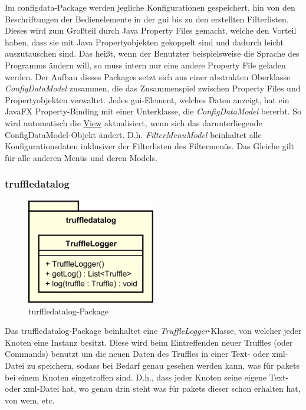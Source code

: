    \medskip
    Im configdata-Package werden jegliche Konfigurationen gespeichert, hin von den
    Beschriftungen der Bedienelemente in der \gls{gui} bis zu den erstellten Filterlisten. Dieses
    wird zum Großteil durch Java Property Files gemacht, welche den Vorteil haben, dass
    sie mit Java Propertyobjekten gekoppelt sind und dadurch leicht auszutauschen sind.
    Das heißt, wenn der Benutzter beispielsweise die Sprache des Programms ändern
    will, so muss intern nur eine andere Property File geladen werden.
    \newline
    \newline
    Der Aufbau dieses Packages setzt sich aus einer abstrakten Oberklasse
    \textit{ConfigDataModel} zusammen, die das Zusammenspiel zwischen Property Files
    und Propertyobjekten verwaltet. Jedes \gls{gui}-Element, welches Daten anzeigt, hat
    ein JavaFX Property-Binding mit einer Unterklasse, die \textit{ConfigDataModel}
    bererbt. So wird automatisch die \hyperref[subsec:view]{View} aktualisiert,
    wenn sich das darunterliegende ConfigDataModel-Objekt ändert. D.h.
    \textit{FilterMenuModel} beinhaltet alle Konfigurationsdaten inklusiver der
    Filterlisten des Filtermenüs. Das Gleiche gilt für alle anderen Menüs und
    deren Models.


    \subsubsection{truffledatalog}
    \label{subsubsec:graphlog}

    \begin{figure}[H]
      \centering
      \includegraphics[width=0.5\textwidth]{../diagramimages/truffledatalog.png}
      \caption{turffledatalog-Package}
    \end{figure}

    \medskip
    Das truffledatalog-Package beinhaltet eine \textit{TruffleLogger}-Klasse, von
    welcher jeder Knoten eine Instanz besitzt. Diese wird beim Eintreffenden neuer Truffles
    (oder Commands) benutzt um die neuen Daten des Truffles in einer Text- oder xml-Datei zu speichern,
    sodass bei Bedarf genau gesehen werden kann, was für \glspl{paket} bei einem
    Knoten eingetroffen sind. D.h., dass jeder Knoten seine eigene Text- oder xml-Datei
    hat, wo genau drin steht was für \glspl{paket} dieser schon erhalten hat,
    von wem, etc.